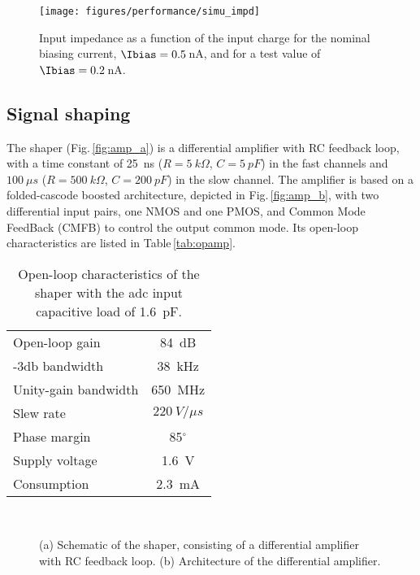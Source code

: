 \begin{figure}[t]
	\begin{center}
		\texttt{[image: figures/performance/simu\_impd]}
		\caption{Input impedance as a function of the input charge for the nominal biasing current, $\Ibias=0.5$\,nA, 
        and for a test value of $\Ibias=0.2$\,nA.}
		\label{fig:Zin_vs_Idc}
	\end{center}
\end{figure}

\subsection{Signal shaping}
\label{subsec:Shaping}

The shaper (Fig.\,\ref{fig:amp_a}) is a differential amplifier with RC feedback loop, with a time constant of \SI{25}{ns} 
($R=\SI{5}{k\Omega}$, $C=\SI{5}{pF}$) in the fast channels and $\SI{100}{\mu s}$ ($R=\SI{500}{k\Omega}$, $C=\SI{200}{pF}$) 
in the slow channel. The amplifier is based on a folded-cascode boosted architecture, depicted in Fig.\,\ref{fig:amp_b}, 
with two differential input pairs, one NMOS and one PMOS, and Common Mode FeedBack (CMFB) to control the output common mode. 
Its open-loop characteristics are listed in Table\,\ref{tab:opamp}. 

\begin{table}[h]
	\centering
	\begin{tabular}{l c}
		\toprule
		Open-loop gain       & \SI{84}{dB}\\
		-3db bandwidth       & \SI{38}{kHz}\\
		Unity-gain bandwidth & \SI{650}{MHz}\\
		Slew rate            & $\SI{220}{V/\mu s}$\\
		Phase margin         & 85$^\circ$\\
		Supply voltage       & \SI{1.6}{V}\\
		Consumption          & \SI{2.3}{mA}\\
		\bottomrule
	\end{tabular}
\caption{\label{tab:opamp}Open-loop characteristics of the shaper with the \gls{adc} input capacitive load of \SI{1.6}{pF}.}
\label{amp_charac}
\end{table}	

\begin{figure}[t]
  \centering
  \\
  \caption{(a) Schematic of the shaper, consisting of a differential amplifier with RC feedback loop. 
           (b) Architecture of the differential amplifier.\label{fig:amp}}
\end{figure}

